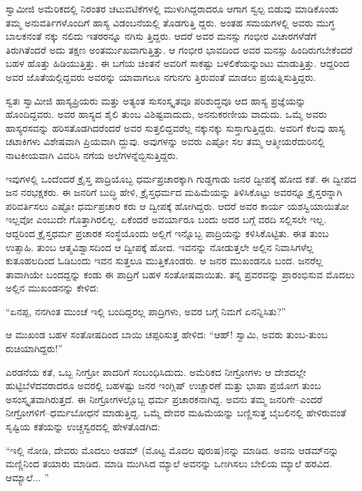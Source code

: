 ಸ್ವಾಮೀಜಿ ಅಮೆರಿಕದಲ್ಲಿ ನಿರಂತರ ಚಟುವಟಿಕೆಗಳಲ್ಲಿ ಮುಳುಗಿದ್ದರಾದರೂ ಆಗಾಗ ಸ್ವಲ್ಪ ಬಿಡುವು ಮಾಡಿಕೊಂಡು ತಮ್ಮ ಅನುವರ್ತಿಗಳೊಂದಿಗೆ ಹಾಸ್ಯ ವಿಡಂಬನೆಯಲ್ಲಿ ತೊಡಗುತ್ತಿ ದ್ದರು. ಅಂತಹ ಸಮಯಗಳಲ್ಲಿ ಅವರು ಮುಗ್ಧ ಬಾಲಕನಂತೆ ನಕ್ಕು ನಲಿದು ಇತರರನ್ನೂ ನಗಿಸು ತ್ತಿದ್ದರು. ಆದರೆ ಅವರ ಮನಸ್ಸು ಗಂಭೀರ ವಿಚಾರಗಳೆಡೆಗೆ ತಿರುಗಿತೆಂದರೆ ಅದು ತಕ್ಷಣ ಅಂತರ್ಮುಖವಾಗುತ್ತಿತ್ತು. ಆ ಗಂಭೀರ ಭಾವದಿಂದ ಅವರ ಮನಸ್ಸು ಹಿಂದಿರುಗಬೇಕೆಂದರೆ ಬಹಳ ಹೊತ್ತು ಹಿಡಿಯುತ್ತಿತ್ತು. ಈ ಬಗೆಯ ಚಿಂತನೆ ಅವರಿಗೆ ಸಾಕಷ್ಟು ಬಳಲಿಕೆಯನ್ನುಂಟು ಮಾಡುತ್ತಿತ್ತು. ಆದ್ದರಿಂದ ಅವರ ಜೊತೆಯಲ್ಲಿದ್ದವರು ಅವರನ್ನು ಯಾವಾಗಲೂ ನಗುನಗು ತ್ತಿರುವಂತೆ ಮಾಡಲು ಪ್ರಯತ್ನಿಸುತ್ತಿದ್ದರು.

ಸ್ವತಃ ಸ್ವಾಮೀಜಿ ಹಾಸ್ಯಪ್ರಿಯರು ಮತ್ತು ಅತ್ಯಂತ ಸುಸಂಸ್ಕೃತವೂ ಪರಿಶುದ್ಧವೂ ಆದ ಹಾಸ್ಯ ಪ್ರಜ್ಞೆಯನ್ನು ಹೊಂದಿದ್ದವರು. ಅವರ ಹಾಸ್ಯದ ಶೈಲಿ ತುಂಬ ವಿಶಿಷ್ಟವಾದುದು, ಅನನುಕರಣೀಯ ವಾದುದು. ಒಮ್ಮೆ ಅವರು ಹಾಸ್ಯರಸವನ್ನು ಹರಿಸತೊಡಗಿದರೆಂದರೆ ಅವರ ಸುತ್ತಲಿದ್ದವರೆಲ್ಲ ನಕ್ಕುನಕ್ಕು ಸುಸ್ತಾಗುತ್ತಿದ್ದರು. ಅವರಿಗೆ ಕೆಲವು ಹಾಸ್ಯ ಚಟಾಕಿಗಳು ವಿಶೇಷವಾಗಿ ಪ್ರಿಯವಾಗಿ ದ್ದುವು. ಅವುಗಳನ್ನು ಅವರು ಎಷ್ಟೋ ಸಲ ತಮ್ಮ ಆತ್ಮೀಯರೆದುರಿನಲ್ಲಿ ನಾಟಕೀಯವಾಗಿ ವಿವರಿಸಿ ನಗೆಯ ಅಲೆಗಳನ್ನೆಬ್ಬಿಸುತ್ತಿದ್ದರು.

ಇವುಗಳಲ್ಲಿ ಒಂದೆಂದರೆ ಕ್ರೈಸ್ತ ಪಾದ್ರಿಯೊಬ್ಬ ಧರ್ಮಪ್ರಚಾರಕ್ಕಾಗಿ ಗುಡ್ಡಗಾಡು ಜನರ ದ್ವೀಪಕ್ಕೆ ಹೋದ ಕತೆ. ಈ ದ್ವೀಪದ ಜನ ನರಭಕ್ಷಕರು. ಈ ಜನರಿಗೆ ಬುದ್ಧಿ ಹೇಳಿ, ಕ್ರೈಸ್ತಧರ್ಮದ ಮಹಿಮೆಯನ್ನು ತಿಳಿಸಿಕೊಟ್ಟು ಅವರನ್ನೂ ಕ್ರೈಸ್ತರನ್ನಾಗಿ ಪರಿವರ್ತಿಸಲು ಎಷ್ಟೋ ಧರ್ಮಪ್ರಚಾರ ಕರು ಆ ದ್ವೀಪಕ್ಕೆ ಹೋಗಿದ್ದರು. ಆದರೆ ಅವರ ಕಾರ್ಯ ಯಶಸ್ವಿಯಾಯಿತೋ ಇಲ್ಲವೋ ಎಂಬುದೇ ಗೊತ್ತಾಗಿರಲಿಲ್ಲ. ಏಕೆಂದರೆ ಅವರ್ಯಾರೂ ಬಂದು ಅದರ ಬಗ್ಗೆ ವರದಿ ಸಲ್ಲಿಸಲೇ ಇಲ್ಲ. ಆದ್ದರಿಂದ ಕ್ರೈಸ್ತಧರ್ಮ ಪ್ರಚಾರಕ ಸಂಸ್ಥೆಯೊಂದು ಅಲ್ಲಿಗೆ ಇನ್ನೊಬ್ಬ ಪಾದ್ರಿಯನ್ನು ಕಳಿಸಿಕೊಟ್ಟಿತು. ಈತ ತುಂಬ ಉತ್ಸಾಹಿ. ತುಂಬ ಆತ್ಮವಿಶ್ವಾಸದಿಂದ ಆ ದ್ವೀಪಕ್ಕೆ ಹೋದ. ಇವನನ್ನು ನೋಡುತ್ತಲೇ ಅಲ್ಲಿನ ನಿವಾಸಿಗಳೆಲ್ಲ ಕುತೂಹಲದಿಂದ ಓಡಿಬಂದು ಇವನ ಸುತ್ತಲೂ ಮುತ್ತಿಕೊಂಡರು. ಆ ಜನರ ಮುಖಂಡನೂ ಬಂದ. ಜನರೆಲ್ಲ ತಾವಾಗಿಯೇ ಬಂದದ್ದನ್ನು ಕಂಡು ಈ ಪಾದ್ರಿಗೆ ಬಹಳ ಸಂತೋಷವಾಯಿತು. ತನ್ನ ಪ್ರವರವನ್ನು ಪ್ರಾರಂಭಿಸುವ ಮೊದಲು ಅಲ್ಲಿನ ಮುಖಂಡನನ್ನು ಕೇಳಿದ:

“ಏನಪ್ಪ, ನನಗಿಂತ ಮುಂಚೆ ಇಲ್ಲಿ ಬಂದಿದ್ದರಲ್ಲ ಪಾದ್ರಿಗಳು, ಅವರ ಬಗ್ಗೆ ನಿಮಗೆ ಏನನ್ನಿಸಿತು?”

ಆ ಮುಖಂಡ ಬಹಳ ಸಂತೋಷದಿಂದ ಬಾಯಿ ಚಪ್ಪರಿಸುತ್ತ ಹೇಳಿದ: “ಆಹ್! ಸ್ವಾಮಿ, ಅವರು ತುಂಬ-ತುಂಬ ರುಚಿಯಾಗಿದ್ದರು!”

ಎರಡನೆಯ ಕತೆ, ಒಬ್ಬ ನೀಗ್ರೋ ಪಾದರಿಗೆ ಸಂಬಂಧಿಸಿದುದು. ಅಮೆರಿಕದ ನೀಗ್ರೋಗಳು ಆ ದೇಶದಲ್ಲೇ ಹುಟ್ಟಿಬೆಳೆದವರಾದರೂ ಅವರಲ್ಲಿ ಬಹಳಷ್ಟು ಜನರ ಇಂಗ್ಲಿಷ್ ಉಚ್ಚಾರಣೆ ಮತ್ತು ಭಾಷಾ ಪ್ರಯೋಗ ತುಂಬ ಅಸಂಸ್ಕೃತವಾಗಿರುತ್ತದೆ. ಈ ನೀಗ್ರೋಗಳಲ್ಲೊಬ್ಬ ಧರ್ಮ ಪ್ರಚಾರಕನಾಗಿದ್ದ. ಅವನು ತಮ್ಮ ಜನರಿಗೇ–ಎಂದರೆ ನೀಗ್ರೋಗಳಿಗೆ–ಧರ್ಮಬೋಧನೆ ಮಾಡುತ್ತಿದ್ದ. ಒಮ್ಮೆ ದೇವರ ಮಹಿಮೆಯನ್ನು ಬಣ್ಣಿಸುತ್ತ ಬೈಬಲಿನಲ್ಲಿ ಹೇಳಿರುವಂತೆ ಸೃಷ್ಟಿಯ ಕತೆಯನ್ನು ಉಚ್ಚಸ್ವರದಲ್ಲಿ ಹೇಳತೊಡಗಿದ:

“ಇಲ್ಲಿ ನೋಡಿ, ದೇವರು ಮೊದಲು ಆಡಮ್ (ಮೊಟ್ಟ ಮೊದಲ ಪುರುಷ)ನನ್ನು ಮಾಡಿದ. ಅವನು ಆಡಮ್​ನನ್ನು ಮಣ್ಣಿನಿಂದ ತಯಾರು ಮಾಡಿದ. ಮಾಡಿ ಮುಗಿಸಿದ ಮ್ಯಾಲೆ ಅವನನ್ನು ಒಣಗಿಸಲು ಬೇಲಿಯ ಮ್ಯಾಲೆ ಹರವಿದ. ಆಮ್ಯಾಲೆ... ”

